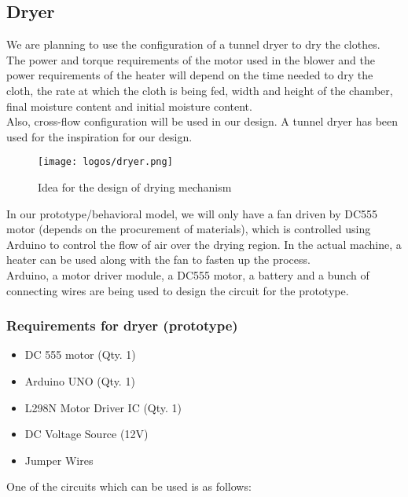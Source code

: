\documentclass[table,french,english]{rapportCS}
\begin{document}
\subsection{Dryer}

We are planning to use the configuration of a tunnel dryer to dry the clothes. The power and torque requirements of the motor used in the blower and the power requirements of the heater will depend on the time needed to dry the cloth, the rate at which the cloth is being fed, width and height of the chamber, final moisture content and initial moisture content.\\
Also, cross-flow configuration will be used in our design. A tunnel dryer has been used for the inspiration for our design.

\vspace{1cm}
\begin{figure}[h]
    \centering
    \texttt{[image: logos/dryer.png]}
    \caption{Idea for the design of drying mechanism}
    \label{fig:outlinemindmap}
\end{figure}

In our prototype/behavioral model, we will only have a fan driven by DC555 motor (depends on the procurement of materials), which is controlled using Arduino to control the flow of air over the drying region. In the actual machine, a heater can be used along with the fan to fasten up the process.\\
Arduino, a motor driver module, a DC555 motor, a battery and a bunch of connecting wires are being used to design the circuit for the prototype.
\subsubsection{Requirements for dryer (prototype)}
\begin{itemize}[label=$\bullet$]
\item DC 555 motor (Qty. 1)
\item Arduino UNO (Qty. 1)
\item L298N Motor Driver IC (Qty. 1)
\item DC Voltage Source (12V)
\item Jumper Wires

\end{itemize}

One of the circuits which can be used is as follows:
\end{document}

